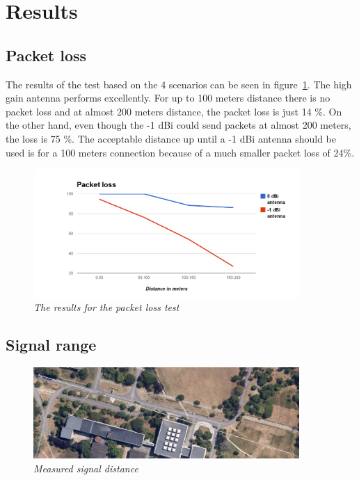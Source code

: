 \section{Results}
 
\subsection{Packet loss}

The results of the test based on the 4 scenarios can be seen in figure~\ref{fig:packet_loss}. The high gain antenna performs excellently. For up to 100 meters distance there is no packet loss and at almost 200 meters distance, the packet loss is just 14 \%. On the other hand, even though the -1 dBi could send packets at almost 200 meters, the loss is 75 \%. The acceptable distance up until a -1 dBi antenna should be used is for a 100 meters connection because of a much smaller packet loss of 24\%. 

\begin{figure}[ht]
\begin{center}
\includegraphics[width=0.9\textwidth]{img/packet_loss.png}
\end{center}
\caption{\small \itshape{The results for the packet loss test}}
  \label{fig:packet_loss}
\end{figure}
 
\subsection{Signal range}

\begin{figure}[ht]
\begin{center}
\includegraphics[width=0.9\textwidth]{img/distance.png}
\end{center}
\caption{\small \itshape{Measured signal distance}}
  \label{fig:distance}
\end{figure}


